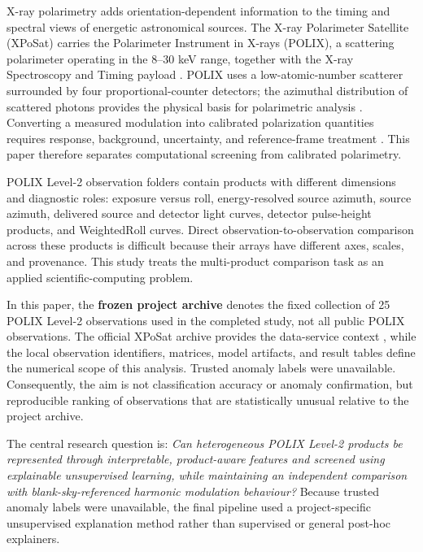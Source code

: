 \documentclass[conference]{IEEEtran}
\begin{document}
X-ray polarimetry adds orientation-dependent information to the timing and spectral views of energetic astronomical sources. The X-ray Polarimeter Satellite (XPoSat) carries the Polarimeter Instrument in X-rays (POLIX), a scattering polarimeter operating in the 8--30 keV range, together with the X-ray Spectroscopy and Timing payload \cite{isro_xposat}. POLIX uses a low-atomic-number scatterer surrounded by four proportional-counter detectors; the azimuthal distribution of scattered photons provides the physical basis for polarimetric analysis \cite{rishin2010thomson,fabiani2018instrumentation}. Converting a measured modulation into calibrated polarization quantities requires response, background, uncertainty, and reference-frame treatment \cite{fabiani2018instrumentation,kislat2015stokes}. This paper therefore separates computational screening from calibrated polarimetry.


POLIX Level-2 observation folders contain products with different dimensions and diagnostic roles: exposure versus roll, energy-resolved source azimuth, source azimuth, delivered source and detector light curves, detector pulse-height products, and WeightedRoll curves. Direct observation-to-observation comparison across these products is difficult because their arrays have different axes, scales, and provenance. This study treats the multi-product comparison task as an applied scientific-computing problem.


In this paper, the \textbf{frozen project archive} denotes the fixed collection of 25 POLIX Level-2 observations used in the completed study, not all public POLIX observations. The official XPoSat archive provides the data-service context \cite{issdc_xposat_archive}, while the local observation identifiers, matrices, model artifacts, and result tables define the numerical scope of this analysis. Trusted anomaly labels were unavailable. Consequently, the aim is not classification accuracy or anomaly confirmation, but reproducible ranking of observations that are statistically unusual relative to the project archive.


The central research question is: \emph{Can heterogeneous POLIX Level-2 products be represented through interpretable, product-aware features and screened using explainable unsupervised learning, while maintaining an independent comparison with blank-sky-referenced harmonic modulation behaviour?} Because trusted anomaly labels were unavailable, the final pipeline used a project-specific unsupervised explanation method rather than supervised or general post-hoc explainers.
\end{document}
